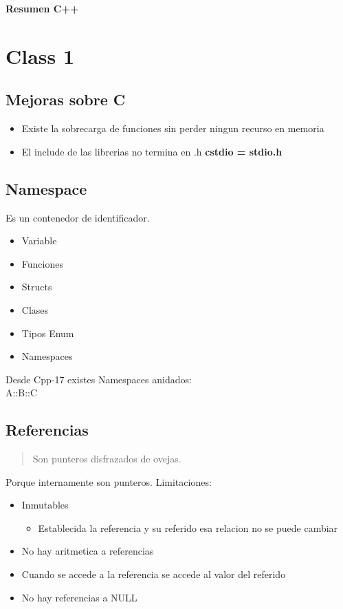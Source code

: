 \documentclass[11pt,letterpaper]{article}
\begin{document}
\begin{center}
    \textbf{Resumen C++}
\end{center}

\section{Class 1}
\subsection{Mejoras sobre C}
\begin{itemize}
    \item Existe la sobrecarga de funciones sin perder ningun recurso en memoria
    \item El include de las librerias no termina en .h \textbf{cstdio = stdio.h}
\end{itemize}
\subsection{Namespace}
Es un contenedor de identificador.
\begin{itemize}
    \item Variable
    \item Funciones
    \item Structs
    \item Clases
    \item Tipos Enum
    \item Namespaces
\end{itemize}
Desde Cpp-17 existes Namespaces anidados: \\
A::B::C
\subsection{Referencias}
\begin{quote}
    Son punteros disfrazados de ovejas.
\end{quote}
Porque internamente son punteros.
Limitaciones: 
\begin{itemize}
    \item Inmutables
    \begin{itemize}
        \item Establecida la referencia y su referido esa relacion no se puede cambiar
    \end{itemize}
    \item No hay aritmetica a referencias 
    \item Cuando se accede a la referencia se accede al valor del referido
    \item No hay referencias a NULL
\end{itemize}
\end{document}
